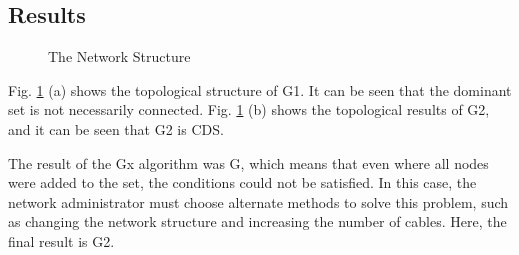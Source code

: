 \documentclass[AMA,STIX1COL]{WileyNJD-v2}
\begin{document}
\subsection{Results}
\begin{figure}[htbp]
\centering                                                          %
\caption{The Network Structure} %
\label{G}
\end{figure}
\par Fig. \ref{G} (a) shows the topological structure of G1. It can be seen that the dominant set is not necessarily connected. Fig. \ref{G} (b) shows the topological results of G2, and it can be seen that G2 is CDS.





\par The result of the Gx algorithm was G, which means that even where all nodes were added to the set, the conditions could not be satisfied. In this case, the network administrator must choose alternate methods to solve this problem, such as changing the network structure and increasing the number of cables. Here, the final result is G2.
\end{document}
